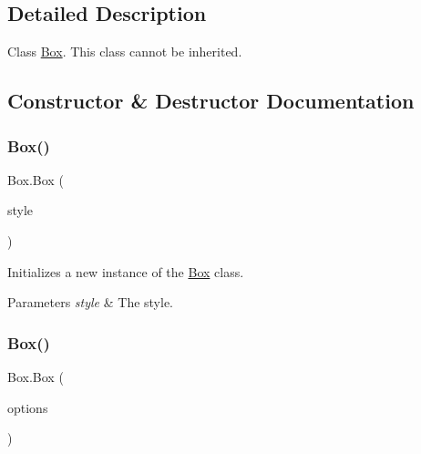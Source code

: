 \subsection{Detailed Description}
Class \hyperlink{class_box}{Box}. This class cannot be inherited. 



\subsection{Constructor \& Destructor Documentation}
\mbox{\label{class_box_ae72544881fa98a2f438f3602dee6c8c5}} 
\subsubsection{\texorpdfstring{Box()}{Box()}\hspace{0.1cm}{\footnotesize\ttfamily [1/3]}}
{\footnotesize\ttfamily Box.\+Box (\begin{DoxyParamCaption}\item[{G\+U\+I\+Style}]{style }\end{DoxyParamCaption})\hspace{0.3cm}{\ttfamily [inline]}}



Initializes a new instance of the \hyperlink{class_box}{Box} class. 


\begin{DoxyParams}{Parameters}
{\em style} & The style.\\
\hline
\end{DoxyParams}
\mbox{\label{class_box_a00e3d2864acc9cb2c7cb12eb7bb9734d}} 
\subsubsection{\texorpdfstring{Box()}{Box()}\hspace{0.1cm}{\footnotesize\ttfamily [2/3]}}
{\footnotesize\ttfamily Box.\+Box (\begin{DoxyParamCaption}\item[{params G\+U\+I\+Layout\+Option \mbox{[}$\,$\mbox{]}}]{options }\end{DoxyParamCaption})\hspace{0.3cm}{\ttfamily [inline]}}




